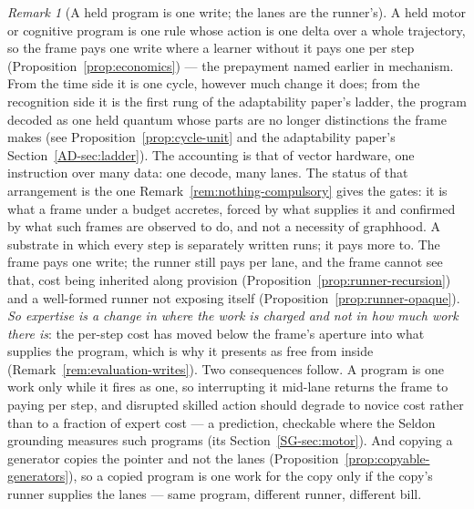 \documentclass[11pt,a4paper]{article}
\theoremstyle{remark}\newtheorem{remark}[definition]{Remark}
\begin{document}
\begin{remark}[A held program is one write; the lanes are the runner's]\label{rem:one-write}
A held motor or cognitive program is one rule whose action is one delta over a whole trajectory, so the
frame pays one write where a learner without it pays one per step (Proposition~\ref{prop:economics}) ---
the prepayment named earlier in mechanism. From the time side it is one cycle,
however much change it does; from the recognition side it is the
first rung of the adaptability paper's ladder, the program decoded as
one held quantum whose parts are no longer distinctions the frame makes (see Proposition~\ref{prop:cycle-unit}
and the adaptability paper's Section~\ref{AD-sec:ladder}). The accounting is that of
vector hardware, one instruction over many data: one decode, many lanes. The status of that arrangement
is the one Remark~\ref{rem:nothing-compulsory} gives the gates: it is what a frame under a budget
accretes, forced by what supplies it and confirmed by what such frames are observed to do, and not a
necessity of graphhood. A substrate in which every step is separately written runs; it pays more to.
The frame pays one write; the
runner still pays per lane, and the frame cannot see that, cost being inherited along provision
(Proposition~\ref{prop:runner-recursion}) and a well-formed runner not exposing itself
(Proposition~\ref{prop:runner-opaque}). \emph{So expertise is a change in where the work is charged and
not in how much work there is}: the per-step cost has moved below the frame's aperture into what
supplies the program, which is why it presents as free from inside (Remark~\ref{rem:evaluation-writes}).
Two consequences follow. A program is one work only while it fires as one, so interrupting it mid-lane
returns the frame to paying per step, and disrupted skilled action should degrade to novice cost rather
than to a fraction of expert cost --- a prediction, checkable where the Seldon grounding measures such
programs (its Section~\ref{SG-sec:motor}). And copying a generator copies the pointer and not the lanes
(Proposition~\ref{prop:copyable-generators}), so a copied program is one work for the copy only if the
copy's runner supplies the lanes --- same program, different runner, different bill.
\end{remark}
\end{document}
